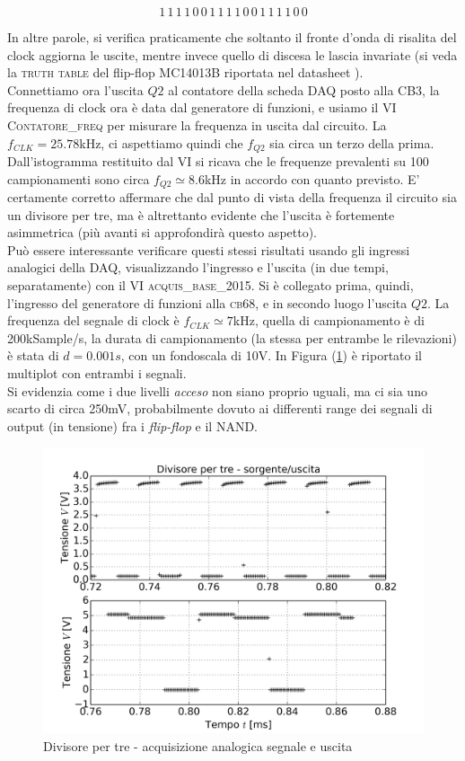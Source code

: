 \documentclass[journal, a4paper]{IEEEtran}
\begin{document}
\begin{equation}
1\,1\,1\,1\,0\,0\,1\,1\,1\,1\,0\,0\,1\,1\,1\,1\,0\,0
\end{equation}

In altre parole, si verifica praticamente che soltanto il fronte d'onda di risalita del clock aggiorna le uscite, mentre invece quello di discesa le lascia invariate (si veda la \textsc{truth table} del flip-flop MC14013B riportata nel datasheet \cite{M06}).\\
Connettiamo ora l'uscita $Q2$ al contatore della scheda DAQ posto alla \textsc{CB3}, la frequenza di clock ora è data dal generatore di funzioni, e usiamo il VI \textsc{Contatore\_freq} per misurare la frequenza in uscita dal circuito. La $f_{CLK} = 25.78$kHz, ci aspettiamo quindi che $f_{Q2}$ sia circa un terzo della prima. Dall'istogramma restituito dal VI si ricava che le frequenze prevalenti su 100 campionamenti sono circa $f_{Q2} \simeq $8.6kHz in accordo con quanto previsto. E' certamente corretto affermare che dal punto di vista della frequenza il circuito sia un divisore per tre, ma è altrettanto evidente che l'uscita è fortemente asimmetrica (più avanti si approfondirà questo aspetto).\\

Può essere interessante verificare questi stessi risultati usando gli ingressi analogici della \textsc{DAQ}, visualizzando l'ingresso e l'uscita (in due tempi, separatamente) con il VI \textsc{acquis\_base\_2015}. Si è collegato prima, quindi, l'ingresso del generatore di funzioni alla \textsc{cb68}, e in secondo luogo l'uscita $Q2$. La frequenza del segnale di clock è $f_{CLK} \simeq 7$kHz, quella di campionamento è di 200kSample/s, la durata di campionamento (la stessa per entrambe le rilevazioni) è stata di $d = 0.001s$, con un fondoscala di 10V. In Figura (\ref{fig:es12_prova}) è riportato il multiplot con entrambi i segnali.\\
Si evidenzia come i due livelli \textit{acceso} non siano proprio uguali, ma ci sia uno scarto di circa 250mV, probabilmente dovuto ai differenti range dei segnali di output (in tensione) fra i \textit{flip-flop} e il \textsc{NAND}.\\

\begin{figure}
\centering
\includegraphics[width=0.8\linewidth]{./es12_prova}
\caption{Divisore per tre - acquisizione analogica segnale e uscita}
\label{fig:es12_prova}
\end{figure}
\end{document}

